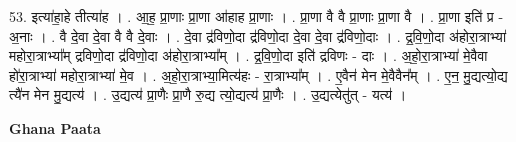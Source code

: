 \documentclass[17pt]{extarticle}
\begin{document}
53. इत्या॑हा॒हे तीत्या॑ह । . आ॒ह॒ प्रा॒णाः प्रा॒णा आ॑हाह प्रा॒णाः । . प्रा॒णा वै वै प्रा॒णाः प्रा॒णा वै । . प्रा॒णा इति॑ प्र - अ॒नाः । . वै दे॒वा दे॒वा वै वै दे॒वाः । . दे॒वा द्र॑विणो॒दा द्र॑विणो॒दा दे॒वा दे॒वा द्र॑विणो॒दाः । . द्र॒वि॒णो॒दा अ॑होरा॒त्राभ्या॑ महोरा॒त्राभ्या᳚म् द्रविणो॒दा द्र॑विणो॒दा अ॑होरा॒त्राभ्या᳚म् । . द्र॒वि॒णो॒दा इति॑ द्रविणः - दाः । . अ॒हो॒रा॒त्राभ्या॑ मे॒वैवा हो॑रा॒त्राभ्या॑ महोरा॒त्राभ्या॑ मे॒व । . अ॒हो॒रा॒त्राभ्या॒मित्य॑हः - रा॒त्राभ्या᳚म् । . ए॒वैन॑ मेन मे॒वैवैन᳚म् । . ए॒न॒ मु॒द्यत्यो॒द्य त्यै॑न मेन मु॒द्यत्य॑ । . उ॒द्यत्य॑ प्रा॒णैः प्रा॒णै रु॒द्य त्यो॒द्यत्य॑ प्रा॒णैः । . उ॒द्यत्येतु॑त् - यत्य॑ । \newline

\textbf{Ghana Paata } \newline
\end{document}

